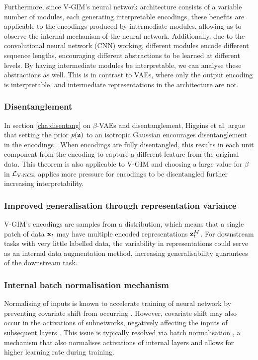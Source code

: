 		Furthermore, since V-GIM's neural network architecture consists of a variable number of modules, each generating interpretable encodings, these benefits are applicable to the encodings produced by intermediate modules, allowing us to observe the internal mechanism of the neural network. Additionally, due to the convolutional neural network (CNN) working, different modules encode different sequence lengths, encouraging different abstractions to be learned at different levels. By having intermediate modules be interpretable, we can analyse these abstractions as well. This is in contrast to VAEs, where only the output encoding is interpretable, and intermediate representations in the architecture are not.

						
	\subsubsection{Disentanglement}
		In section \ref{cha:disentang} on $\beta$-VAEs and disentanglement, Higgins et al. argue that setting the prior $p(\mathbf{z})$ to an isotropic Gaussian encourages disentanglement in the encodings \cite{higginsBetaVAELearningBasic2022}. When encodings are fully disentangled, this results in each unit component from the encoding to capture a different feature from the original data. This theorem is also applicable to V-GIM and choosing a large value for $\beta$ in $\mathcal{L}_{\text{V-NCE}}$ applies more pressure for encodings to be disentangled further increasing interpretability.
		
	
	\subsubsection{Improved generalisation through representation variance}
		V-GIM's encodings are samples from a distribution, which means that a single patch of data $\mathbf{x}_t$ may have multiple encoded representations $\mathbf{z}_t^M$. For downstream tasks with very little labelled data, the variability in representations could serve as an internal data augmentation method, increasing generalisability guarantees of the downstream task.

	
	\subsubsection{Internal batch normalisation mechanism}
		Normalising of inputs is known to accelerate training of neural network by preventing covariate shift from occurring \cite{ioffeBatchNormalizationAccelerating2015, bjorckUnderstandingBatchNormalization2018, lecunEfficientBackProp1998}. However, covariate shift may also occur in the activations of subnetworks, negatively affecting the inputs of subsequent layers \cite{bjorckUnderstandingBatchNormalization2018}. This issue is typically resolved via batch normalisation \cite{santurkarHowDoesBatch2018, bjorckUnderstandingBatchNormalization2018}, a mechanism that also normalises activations of internal layers and allows for higher learning rate during training.
		
